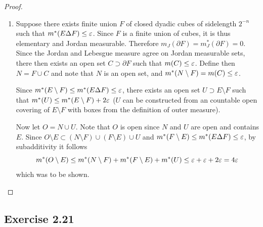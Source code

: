 \documentclass[hw_all.tex]{subfiles}
\begin{document}
\begin{proof}
\begin{enumerate}
        \item[ix $\Rightarrow$ i)]
            Suppose there exists finite union $F$ of closed dyadic cubes of sidelength $2^{-n}$ such that $m^*(E \Delta F) \leq \varepsilon$. Since $F$ is a finite union of cubes, it is thus elementary and Jordan measurable. Therefore $m_J(\partial F) = m_J^*(\partial F) = 0$. Since the Jordan and Lebesgue measure agree on Jordan measurable sets, there then exists an open set $C \supset \partial F$ such that $m(C) \leq \varepsilon$. Define then $N = F \cup C$ and note that $N$ is an open set, and $m^*(N \setminus F) = m(C) \leq \varepsilon$.

            Since $m^*(E \setminus F) \leq m^*(E \Delta F) \leq \varepsilon$, there exists an open set $U \supset E \setminus F$ such that $m^*(U) \leq m^*(E \setminus F) + 2\varepsilon$ ($U$ can be constructed from an countable open covering of $E \setminus F$ with boxes from the definition of outer measure). 

            Now let $O = N \cup U$. Note that $O$ is open since $N$ and $U$ are open and contains $E$. Since $O \setminus E \subset (N \setminus F) \cup (F \setminus E) \cup U$ and $m^*(F \setminus E) \leq m^*(E \Delta F) \leq \varepsilon$, by subadditivity it follows
            \[
                m^*(O \setminus E) \leq m^*(N \setminus F) + m^*(F \setminus E) + m^*(U) \leq \varepsilon + \varepsilon + 2\varepsilon = 4\varepsilon
            \]
            which was to be shown.
    \end{enumerate}
\end{proof}

\subsection{Exercise 2.21}
\end{document}
